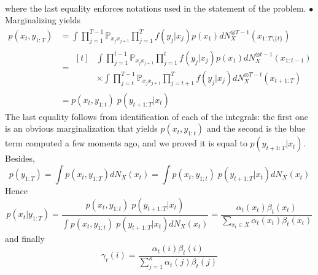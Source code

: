 \documentclass[a4paper,11pt, hidelinks]{article}
\begin{document}
\begin{enumerate}[label=(\alph*)]
$$\begin{aligned}
	\end{aligned}
	$$
	where the last equality enforces notations used in the statement of the problem.
	\newline
	\newline
	$\bullet$ Marginalizing yields $$\begin{aligned}
		p(x_t, y_{1:T}) &= \int \prod_{j=1}^{T-1}\mathbb P_{x_{j} x_{j+1}} \prod_{j=1}^{T}f(y_j|x_j) p(x_1) dN_X^{\otimes T-1}(x_{1:T\setminus \{t\}}) \\
		&= \begin{aligned}[t]&\int \prod_{j=1}^{t-1}\mathbb P_{x_{j} x_{j+1}}\prod_{j=1}^{t}f(y_j|x_j) p(x_1) dN_X^{\otimes t-1}(x_{1:t-1})\\ &\times \int \prod_{j=t}^{T-1}\mathbb P_{x_{j} x_{j+1}} \prod_{j=t+1}^{T}f(y_j|x_j) dN_X^{\otimes T-t}(x_{t+1:T}) \end{aligned}\\
		&= p(x_t, y_{1:t})\; p(y_{t+1:T}|x_t)
	\end{aligned} $$
	The last equality follows from identification of each of the integrals: the first one is an obvious marginalization that yields $p(x_t, y_{1:t})$ and the second is the blue term computed a few moments ago, and we proved it is equal to $p(y_{t+1:T}|x_t)$.
	Besides, $$
		p(y_{1:T}) = \int p(x_t, y_{1:T}) dN_X(x_t) = \int p(x_t, y_{1:t})\; p(y_{t+1:T}|x_t) dN_X(x_t)$$
	Hence $$p(x_t| y_{1:T}) = \frac{p(x_t, y_{1:t})\; p(y_{t+1:T}|x_t)}{\int p(x_t, y_{1:t})\; p(y_{t+1:T}|x_t) dN_X(x_t)} = \frac{\alpha_t(x_t)\beta_t(x_t)}{\sum_{x_t\in X} \alpha_t(x_t)\beta_t(x_t) }$$
	and finally $$ \gamma_t(i) = \frac{\alpha_t(i)\beta_t(i)}{\sum_{j=1}^\kappa \alpha_t(j)\beta_t(j)}$$


\end{enumerate}
\end{document}
